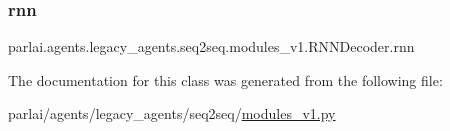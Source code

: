 \subsubsection{\texorpdfstring{rnn}{rnn}}
{\footnotesize\ttfamily parlai.\+agents.\+legacy\+\_\+agents.\+seq2seq.\+modules\+\_\+v1.\+R\+N\+N\+Decoder.\+rnn}



The documentation for this class was generated from the following file\+:\begin{DoxyCompactItemize}
\item 
parlai/agents/legacy\+\_\+agents/seq2seq/\hyperlink{modules__v1_8py}{modules\+\_\+v1.\+py}\end{DoxyCompactItemize}
